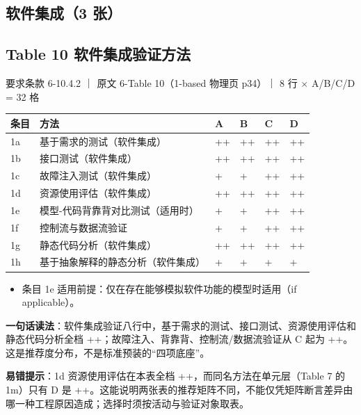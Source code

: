 \subsection{软件集成（3 张）}

\subsection{Table 10 软件集成验证方法}

要求条款 6-10.4.2 ｜ 原文 6-Table 10（1-based 物理页 p34）｜ 8 行 \(\times\) A/B/C/D = 32 格

\begin{center}
\begingroup\small
\setlength{\tabcolsep}{4pt}
\begin{tabularx}{\linewidth}{@{}XXXXXX@{}}
\toprule
条目 & 方法 & A & B & C & D \\
\midrule
1a & 基于需求的测试（软件集成） & ++ & ++ & ++ & ++ \\
1b & 接口测试（软件集成） & ++ & ++ & ++ & ++ \\
1c & 故障注入测试（软件集成） & + & + & ++ & ++ \\
1d & 资源使用评估（软件集成） & ++ & ++ & ++ & ++ \\
1e & 模型-代码背靠背对比测试（适用时） & + & + & ++ & ++ \\
1f & 控制流与数据流验证 & + & + & ++ & ++ \\
1g & 静态代码分析（软件集成） & ++ & ++ & ++ & ++ \\
1h & 基于抽象解释的静态分析（软件集成） & + & + & + & + \\
\bottomrule
\end{tabularx}
\endgroup
\end{center}

\begin{itemize}
\item 条目 1e 适用前提：仅在存在能够模拟软件功能的模型时适用（if applicable）。
\end{itemize}

\textbf{一句话读法}：软件集成验证八行中，基于需求的测试、接口测试、资源使用评估和静态代码分析全档 ++；故障注入、背靠背、控制流/数据流验证从 C 起为 ++。这是推荐度分布，不是标准预装的“四项底座”。

\textbf{易错提示}：1d 资源使用评估在本表全档 ++，而同名方法在单元层（Table 7 的 1m）只有 D 是 ++。这能说明两张表的推荐矩阵不同，不能仅凭矩阵断言差异由哪一种工程原因造成；选择时须按活动与验证对象取表。

